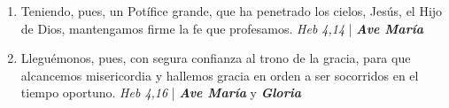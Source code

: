 \documentclass[../../devocionario.tex]{subfiles}
\begin{document}
\begin{enumerate}
        \item Teniendo, pues, un Potífice grande, que ha penetrado los cielos, Jesús, el Hijo de Dios, 
            mantengamos firme la fe que profesamos. \textit{Heb 4,14} | \textbf{\textit{Ave María}}

        \item Lleguémonos, pues, con segura confianza al trono de la gracia, para que alcancemos misericordia 
            y hallemos gracia en orden a ser socorridos en el tiempo oportuno. \textit{Heb 4,16} | \textbf{\textit{Ave María}} y \textbf{\textit{Gloria}}

    \end{enumerate}
\end{document}
